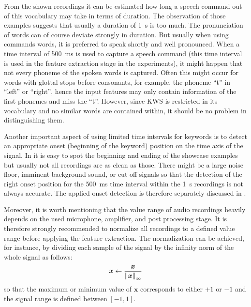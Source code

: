 \FloatBarrier
\noindent
From the shown recordings it can be estimated how long a speech command out of this vocabulary may take in terms of duration.
The observation of those examples suggests that usually a duration of \SI{1}{\second} is too much.
The pronunciation of words can of course deviate strongly in duration.
But usually when using commands words, it is preferred to speak shortly and well pronounced.
When a time interval of \SI{500}{\milli\second} is used to capture a speech command (this time interval is used in the feature extraction stage in the experiments), it might happen that not every phoneme of the spoken words is captured.
Often this might occur for words with glottal stops before consonants, for example, the phoneme \enquote{t} in \enquote{left} or \enquote{right}, hence the input features may only contain information of the first phonemes and miss the \enquote{t}.
However, since KWS is restricted in its vocabulary and no similar words are contained within, it should be no problem in distinguishing them.

Another important aspect of using limited time intervals for keywords is to detect an appropriate onset (beginning of the keyword) position on the time axis of the signal.
In  it is easy to spot the beginning and ending of the showcase examples but usually not all recordings are as clean as those.
There might be a large noise floor, imminent background sound, or cut off signals so that the detection of the right onset position for the \SI{500}{\milli\second} time interval within the \SI{1}{\second} recordings is not always accurate.
The applied onset detection is therefore separately discussed in .

Moreover, it is worth mentioning that the value range of audio recordings heavily depends on the used microphone, amplifier, and post processing stage.
It is therefore strongly recommended to normalize all recordings to a defined value range before applying the feature extraction.
The normalization can be achieved, for instance, by dividing each sample of the signal by the infinity norm of the whole signal as follows:
\begin{equation}
  \bm{x} \gets \frac{\bm{x}}{\norm{\bm{x}}_\infty}
\end{equation}
so that the maximum or minimum value of $\bm{x}$ corresponds to either $+1$ or $-1$ and the signal range is defined between $[-1, 1]$.